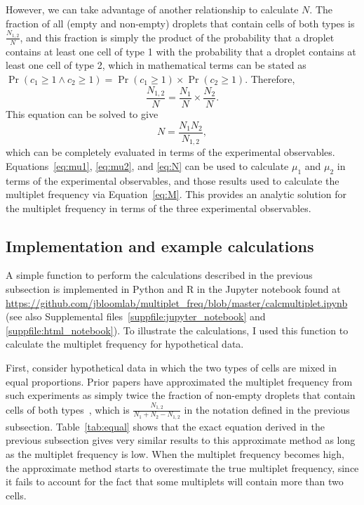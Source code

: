 \documentclass[fleqn,10pt]{wlpeerj} %
\begin{document}
However, we can take advantage of another relationship to calculate $N$.
The fraction of all (empty and non-empty) droplets that contain cells of both types is $\frac{N_{1,2}}{N}$, and this fraction is simply the product of the probability that a droplet contains at least one cell of type 1 with the probability that a droplet contains at least one cell of type 2, which in mathematical terms can be stated as $\Pr\left(c_1 \ge 1 \land c_2 \ge 1\right) = \Pr\left(c_1 \ge 1\right) \times \Pr\left(c_2 \ge 1\right)$.
Therefore,
\begin{equation}
\frac{N_{1,2}}{N} = \frac{N_1}{N} \times \frac{N_2}{N}.
\end{equation}
This equation can be solved to give
\begin{equation}
\label{eq:N}
N = \frac{N_1 N_2}{N_{1,2}},
\end{equation}
which can be completely evaluated in terms of the experimental observables.
Equations~\ref{eq:mu1}, \ref{eq:mu2}, and \ref{eq:N} can be used to calculate $\mu_1$ and $\mu_2$ in terms of the experimental observables, and those results used to calculate the multiplet frequency via Equation~\ref{eq:M}.
This provides an analytic solution for the multiplet frequency in terms of the three experimental observables.

\subsection*{Implementation and example calculations}
A simple function to perform the calculations described in the previous subsection is implemented in Python and R in the Jupyter notebook found at
\url{https://github.com/jbloomlab/multiplet_freq/blob/master/calcmultiplet.ipynb} (see also Supplemental files~\ref{suppfile:jupyter_notebook} and \ref{suppfile:html_notebook}).
To illustrate the calculations, I used this function to calculate the multiplet frequency for hypothetical data.

First, consider hypothetical data in which the two types of cells are mixed in equal proportions.
Prior papers have approximated the multiplet frequency from such experiments as simply twice the fraction of non-empty droplets that contain cells of both types~\citep{klein2015droplet,macosko2015highly,zheng2017massively,cao2017comprehensive}, which is $\frac{N_{1,2}}{N_1 + N_2 - N_{1,2}}$ in the notation defined in the previous subsection. 
Table~\ref{tab:equal} shows that the exact equation derived in the previous subsection gives very similar results to this approximate method as long as the multiplet frequency is low.
When the multiplet frequency becomes high, the approximate method starts to overestimate the true multiplet frequency, since it fails to account for the fact that some multiplets will contain more than two cells.
\end{document}
